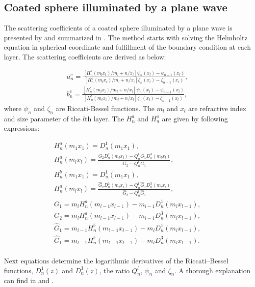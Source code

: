 \documentclass{osa-article}
\begin{document}
\begin{appendices}
\section{Coated sphere illuminated by a plane wave}

The scattering coefficients of a coated sphere illuminated by a plane wave is presented by \cite{Yang} and summarized in \cite{pena}. The method starts with solving the Helmholtz equation in spherical coordinate and fulfillment of the boundary condition at each layer. The scattering coefficients are derived as below:

\begin{equation}\label{eq1_b}
\begin{gathered}
a^c_n=\frac{[H^a_n(m_lx_l)/m_l+n/x_l]\psi_n(x_l)-\psi_{n-1}(x_l)}{[H^a_n(m_lx_l)/m_l+n/x_l]\zeta_n(x_l)-\zeta_{n-1}(x_l)},\\
b^c_n=\frac{[H^b_n(m_lx_l)/m_l+n/x_l]\psi_n(x_l)-\psi_{n-1}(x_l)}{[H^b_n(m_lx_l)/m_l+n/x_l]\zeta_n(x_l)-\zeta_{n-1}(x_l)},
\end{gathered}
\end{equation}
where $\psi_n$ and $\zeta_n$ are Riccati-Bessel functions. The $m_l$ and $x_l$ are refractive index and size parameter of the $l$th layer. The $H^a_n$ and $H^a_n$ are given by following expressions:

\begin{equation}\label{eq2_b}
\begin{gathered}
H^a_n(m_1x_1)=D^1_n(m_1x_1),\\
H^a_n(m_lx_l)=\frac{G_2D^1_n(m_lx_l)-Q^l_nG_1D^3_n(m_lx_l)}{G_2-Q^l_nG_1},\\
H^b_n(m_1x_1)=D^1_n(m_1x_1),\\
H^a_n(m_lx_l)=\frac{\hat G_2D^1_n(m_lx_l)-Q^l_n\hat G_1D^3_n(m_lx_l)}{\hat G_2-Q^l_n\hat G_1},\\
G_1=m_lH^a_n(m_{l-1}x_{l-1})-m_{l-1}D^1_n(m_lx_{l-1}),\\
G_2=m_lH^a_n(m_{l-1}x_{l-1})-m_{l-1}D^3_n(m_lx_{l-1}),\\
\hat G_1=m_{l-1}H^b_n(m_{l-1}x_{l-1})-m_lD^1_n(m_lx_{l-1}),\\
\hat G_1=m_{l-1}H^b_n(m_{l-1}x_{l-1})-m_lD^3_n(m_lx_{l-1}).\\
\end{gathered}
\end{equation}

Next equations determine the logarithmic derivatives of the Riccati–Bessel
functions, $D^1_n(z)$ and $D^3_n(z)$, the ratio $Q^l_n$, $\psi_n$ and $\zeta_n$. A thorough explanation can find in \cite{Yang} and \cite{pena}.


\end{appendices}
\end{document}
